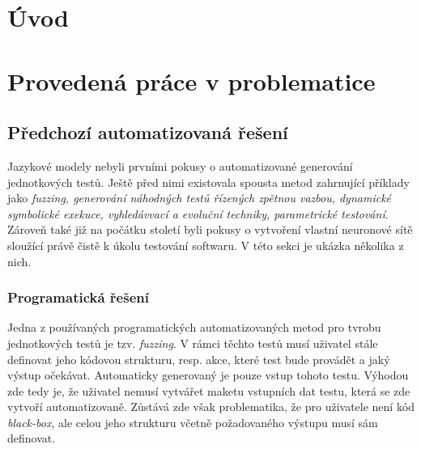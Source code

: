 \documentclass[12pt]{article}
\begin{document}
    \newpage
    \section{Úvod}

    \newpage
    \section{Provedená práce v problematice} \label{sec:previouswork}

        \subsection{Předchozí automatizovaná řešení}
        Jazykové modely nebyli prvními pokusy o automatizované generování jednotkových testů. Ještě před nimi existovala spousta metod zahrnující příklady jako \textit{fuzzing, generování náhodných testů řízených zpětnou vazbou, dynamické symbolické exekuce, vyhledávvací a evoluční techniky, parametrické testování}. Zároveň také již na počátku století byli pokusy o vytvoření vlastní neuronové sítě sloužící právě čistě k úkolu testování softwaru. V této sekci je ukázka několika z nich. 

            \subsubsection{Programatická řešení}
            Jedna z používaných programatických automatizovaných metod pro tvrobu jednotkových testů je tzv. \textit{fuzzing}. V rámci těchto testů musí uživatel stále definovat jeho kódovou strukturu, resp. akce, které test bude provádět a jaký výstup očekávat. Automaticky generovaný je pouze vstup tohoto testu. Výhodou zde tedy je, že uživatel nemusí vytvářet maketu vstupních dat testu, která se zde vytvoří automatizovaně. Zůstává zde však problematika, že pro uživatele není kód \emph{black-box}, ale celou jeho strukturu včetně požadovaného výstupu musí sám definovat. 
\end{document}
